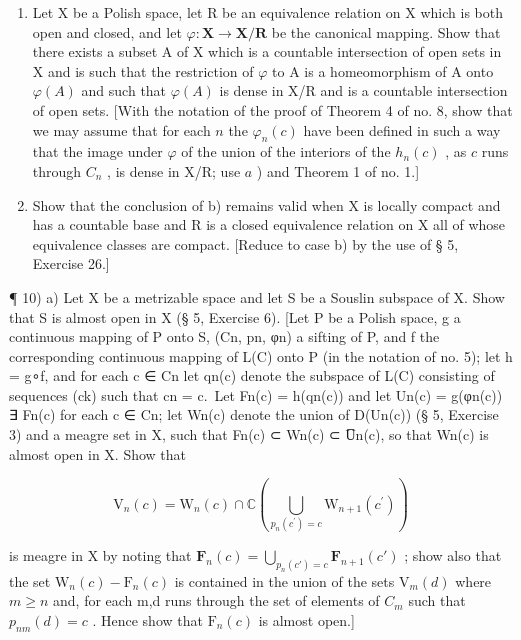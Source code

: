 \begin{enumerate}
\def\labelenumi{\alph{enumi})}
\setcounter{enumi}{1}
\item
  Let X be a Polish space, let R be an equivalence relation on X which is both open and closed, and let \(\varphi: \mathbf{X} \to \mathbf{X} / \mathbf{R}\) be the canonical mapping. Show that there exists a subset A of X which is a countable intersection of open sets in X and is such that the restriction of \(\varphi\) to A is a homeomorphism of A onto \(\varphi(A)\) and such that \(\varphi(A)\) is dense in X/R and is a countable intersection of open sets. {[}With the notation of the proof of Theorem 4 of no. 8, show that we may assume that for each \(n\) the \(\varphi_n(c)\) have been defined in such a way that the image under \(\varphi\) of the union of the interiors of the \(h_n(c)\) , as \(c\) runs through \(C_n\) , is dense in X/R; use \(a\) ) and Theorem 1 of no. 1.{]}
\item
  Show that the conclusion of b) remains valid when X is locally compact and has a countable base and R is a closed equivalence relation on X all of whose equivalence classes are compact. {[}Reduce to case b) by the use of § 5, Exercise 26.{]}
\end{enumerate}

¶ 10) a) Let X be a metrizable space and let S be a Souslin subspace of X. Show that S is almost open in X (§ 5, Exercise 6). {[}Let P be a Polish space, g a continuous mapping of P onto S, (Cn, pn, φn) a sifting of P, and f the corresponding continuous mapping of L(C) onto P (in the notation of no. 5); let h = g∘f, and for each c ∈ Cn let qn(c) denote the subspace of L(C) consisting of sequences (ck) such that cn = c.~Let Fn(c) = h(qn(c)) and let Un(c) = g(φn(c)) ∃ Fn(c) for each c ∈ Cn; let Wn(c) denote the union of D(Un(c)) (§ 5, Exercise 3) and a meagre set in X, such that Fn(c) ⊂ Wn(c) ⊂ U̅n(c), so that Wn(c) is almost open in X. Show that

\[
\mathrm{V} _ {n} (c) = \mathrm{W} _ {n} (c) \cap \mathbb {C} \left(\bigcup_ {p _ {n} \left(c ^ {\prime}\right) = c} \mathrm{W} _ {n + 1} \left(c ^ {\prime}\right)\right)
\]

is meagre in X by noting that \(\mathbf{F}_n(c) = \bigcup_{p_n(c') = c}\mathbf{F}_{n + 1}(c')\) ; show also that the set \(\mathrm{W}_{n}(c)-\mathrm{F}_{n}(c)\) is contained in the union of the sets \(\mathrm{V}_{m}(d)\) where \(m\geqslant n\) and, for each m,d runs through the set of elements of \(C_{m}\) such that \(p_{nm}(d)=c\) . Hence show that \(\mathrm{F}_{n}(c)\) is almost open.{]}

